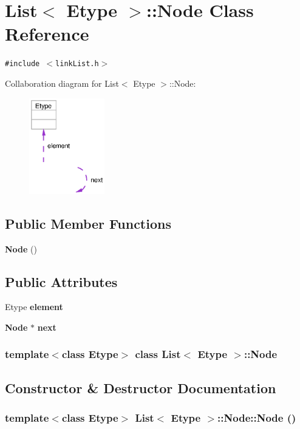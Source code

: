 \section{List$<$ Etype $>$::Node Class Reference}
\label{classList_1_1Node}
{\tt \#include $<$link\-List.h$>$}

Collaboration diagram for List$<$ Etype $>$::Node:\begin{figure}[H]
\begin{center}
\leavevmode
\includegraphics[width=93pt]{classList_1_1Node__coll__graph}
\end{center}
\end{figure}
\subsection*{Public Member Functions}
\begin{CompactItemize}
\item 
{\bf Node} ()
\end{CompactItemize}
\subsection*{Public Attributes}
\begin{CompactItemize}
\item 
Etype {\bf element}
\item 
{\bf Node} $\ast$ {\bf next}
\end{CompactItemize}
\subsubsection*{template$<$class Etype$>$ class List$<$ Etype $>$::Node}



\subsection{Constructor \& Destructor Documentation}
\subsubsection{\setlength{\rightskip}{0pt plus 5cm}template$<$class Etype$>$ {\bf List}$<$ Etype $>$::Node::Node ()\hspace{0.3cm}{\tt  [inline]}}\label{classList_1_1Node_a0}




